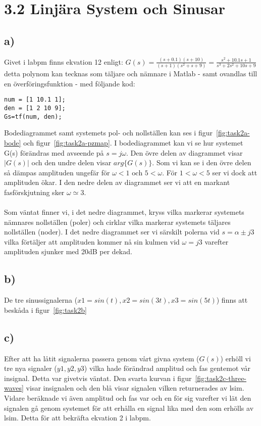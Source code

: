 \section*{3.2 Linjära System och Sinusar}
\subsection*{a)}
Givet i labpm finns ekvation 12 enligt: 
$G(s) = \frac{(s+0.1)(s+10)}{(s+1)(s^2+s+9)} =
\frac{s^2+10.1s+1}{s^3+2s^2+10s+9}$
detta polynom kan tecknas som täljare och nämnare i Matlab - samt ovandlas till
en överföringsfunktion - med följande kod:

\begin{lstlisting}
num = [1 10.1 1];
den = [1 2 10 9];
Gs=tf(num, den);
\end{lstlisting}

Bodediagrammet samt systemets pol- och nollställen kan ses i
figur~\ref{fig:task2a-bode} och figur~\ref{fig:task2a-pzmap}. I bodediagrammet 
kan vi se hur systemet G(s) förändras med avseende på $s=j\omega$. Den övre
delen av diagrammet visar $|G(s)|$ och den undre delen visar $arg\{G(s)\}$.
Som vi kan se i den övre delen så dämpas amplituden ungefär för $\omega < 1
\text{ och } 5 < \omega$. För $1 < \omega < 5$ ser vi dock att amplituden ökar. I
den nedre delen av diagrammet ser vi att en markant fasförskjutning sker
$\omega \simeq 3$.\\\\
Som väntat finner vi, i det nedre diagrammet, kryss vilka markerar systemets
nämnares nollställen (poler) och cirklar vilka markerar systemets täljares
nollställen (noder). I det nedre diagrammet ser vi särskilt polerna vid
$s=\alpha \pm j3$ vilka förtäljer att amplituden kommer nå sin kulmen vid
$\omega = j3$ varefter amplituden sjunker med 20dB per dekad.

\subsection*{b)}
De tre sinussignalerna ($x1 = sin(t), x2 = sin(3t), x3 = sin(5t)$) finns att
beskåda i figur~\ref{fig:task2b}

\subsection*{c)}
Efter att ha låtit signalerna passera genom vårt givna system ($G(s)$) erhöll
vi tre nya signaler ($y1, y2, y3$) vilka hade förändrad amplitud och fas
gentemot vår insignal. Detta var givetvis väntat. Den svarta kurvan i
figur~\ref{fig:task2c-three-waves} visar
insignalen och den blå visar signalen vilken returnerades av lsim. Vidare
beräknade vi även amplitud och fas var och en för sig varefter vi lät den
signalen gå genom systemet för att erhålla en signal lika med den som erhölls
av lsim. Detta för att bekräfta ekvation 2 i labpm.

